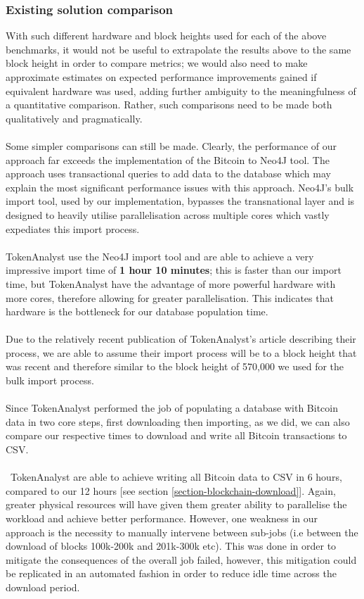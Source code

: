 \subsubsection{Existing solution comparison}
With such different hardware and block heights used for each of the above benchmarks, it would not be useful to extrapolate the results above to the same block height in order to compare metrics; we would also need to make approximate estimates on expected performance improvements gained if equivalent hardware was used, adding further ambiguity to the meaningfulness of a quantitative comparison. Rather, such comparisons need to be made both qualitatively and pragmatically.
\\\\
Some simpler comparisons can still be made. Clearly, the performance of our approach far exceeds the implementation of the Bitcoin to Neo4J tool. The approach uses transactional queries to add data to the database which may explain the most significant performance issues with this approach. Neo4J's bulk import tool, used by our implementation, bypasses the transnational layer and is designed to heavily utilise parallelisation across multiple cores which vastly expediates this import process. 
\\\\
TokenAnalyst use the Neo4J import tool and are able to achieve a very impressive import time of \textbf{1 hour 10 minutes}; this is faster than our import time, but TokenAnalyst have the advantage of more powerful hardware with more cores, therefore allowing for greater parallelisation. This indicates that hardware is the bottleneck for our database population time. 
\\\\
Due to the relatively recent publication of TokenAnalyst's article describing their process, we are able to assume their import process will be to a block height that was recent and therefore similar to the block height of 570,000 we used for the bulk import process.
\\\\
Since TokenAnalyst performed the job of populating a database with Bitcoin data in two core steps, first downloading then importing, as we did, we can also compare our respective times to download and write all Bitcoin transactions to CSV.
\\\\\
TokenAnalyst are able to achieve writing all Bitcoin data to CSV in 6 hours, compared to our 12 hours [see section \ref{section-blockchain-download}]. Again, greater physical resources will have given them greater ability to parallelise the workload and achieve better performance. However, one weakness in our approach is the necessity to manually intervene between sub-jobs (i.e between the download of blocks 100k-200k and 201k-300k etc). This was done in order to mitigate the consequences of the overall job failed, however, this mitigation could be replicated in an automated fashion in order to reduce idle time across the download period. 

